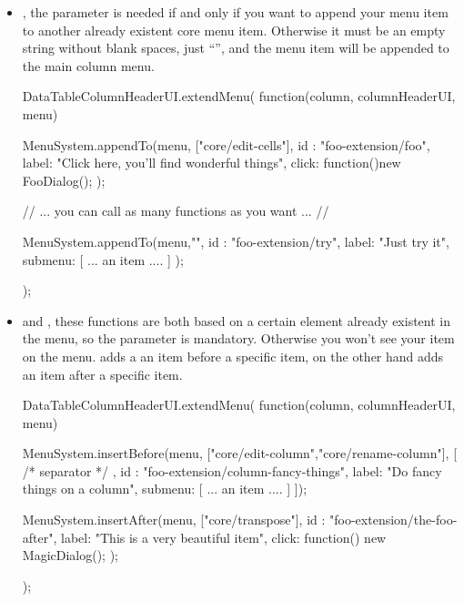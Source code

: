 \begin{itemize}
	\item {}, the  parameter is needed if and only if you want to append your menu item to another already existent core menu item. Otherwise it must be an empty string without blank spaces, just ``'', and the menu item will be appended to the main column menu.
	\begin{code}
DataTableColumnHeaderUI.extendMenu(
   function(column, columnHeaderUI, menu){	
      MenuSystem.appendTo(menu, ["core/edit-cells"], {
         id : "foo-extension/foo",
         label: "Click here, you'll find wonderful things",
         click: function(){new FooDialog();}
      });
   
   // ... you can call as many functions as you want ... //  
   
      MenuSystem.appendTo(menu,"", {
         id : "foo-extension/try",
         label: "Just try it",
         submenu: [
            { ... an item .... } 
         ]
      });
});
	\end{code} 
	\item {} and , these functions are both based on a certain element already existent in the menu, so the  parameter is mandatory. Otherwise you won't see your item on the menu.  adds a an item before a specific item, on the other hand  adds an item after a specific item.
	\begin{code}
DataTableColumnHeaderUI.extendMenu(
   function(column, columnHeaderUI, menu){	
      MenuSystem.insertBefore(menu,
      ["core/edit-column","core/rename-column"], 
      [ { /* separator */ }, {
         id : "foo-extension/column-fancy-things",
         label: "Do fancy things on a column",
         submenu: [
            { ... an item .... } 
         ]
      } ]);
      
   MenuSystem.insertAfter(menu, ["core/transpose"], {
      id : "foo-extension/the-foo-after",
      label: "This is a very beautiful item",
      click: function(){ new MagicDialog(); }
   });
});
	\end{code}	
\end{itemize} 

